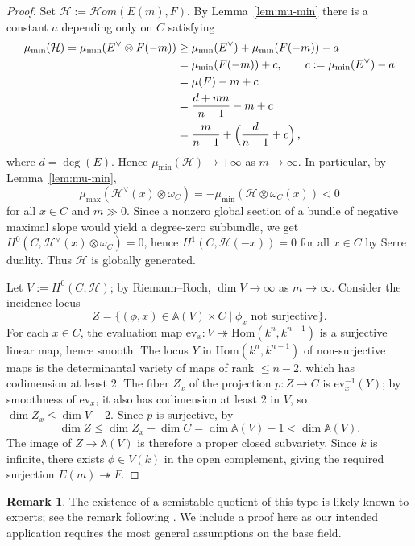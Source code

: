\documentclass[12pt,reqno]{amsart}
\newcommand{\mc}[1]{\mathcal{#1}}
\theoremstyle{definition}
\newtheorem{remark}[theorem]{Remark}
\numberwithin{equation}{section}
\begin{document}
	\begin{proof}
		Set $\mathcal{H} := \mathcal{H}om(E(m), F)$. By Lemma~\ref{lem:mu-min}
		there is a constant $a$ depending only on $C$ satisfying
		\begin{align*}
			\mu_{\mathrm{min}}(\mc{H})
			= \mu_{\min}(E^{\vee} \otimes F(-m))
			&\geq \mu_{\min}(E^{\vee}) + \mu_{\min}(F(-m)) - a \\
			&= \mu_{\mathrm{min}}(F(-m)) + c,
			\qquad c:=\mu_{\min}(E^{\vee})-a \\
			&= \mu(F) - m + c \\
			&= \frac{d+mn}{n-1} - m + c \\
			&= \frac{m}{n-1} + \Bigl(\frac{d}{n-1}+c\Bigr)\,,
		\end{align*}
		where $d = \deg(E)$. Hence $\mu_{\min}(\mathcal{H}) \to +\infty$ as
		$m \to \infty$. In particular, by Lemma~\ref{lem:mu-min},
		\[
		\mu_{\max}(\mathcal{H}^\vee(x) \otimes \omega_C)
		= -\mu_{\min}(\mc{H}\otimes \omega_C(x)) < 0
		\]
		for all $x \in C$ and $m\gg 0$. Since a nonzero global section of a bundle
		of negative maximal slope would yield a degree-zero subbundle, we get
		$H^0(C, \mathcal{H}^\vee(x) \otimes \omega_C) = 0$, hence
		$H^1(C, \mathcal{H}(-x)) = 0$ for all $x\in C$ by Serre duality. Thus
		$\mathcal{H}$ is globally generated.
		
		Let $V := H^0(C, \mathcal{H})$; by Riemann--Roch, $\dim V \to \infty$ as
		$m\to \infty$. Consider the incidence locus
		\[
		Z = \{(\phi, x) \in \mathbb{A}(V) \times C \mid \phi_x
		\text{ not surjective}\}.
		\]
		For each $x \in C$, the evaluation map
		$\mathrm{ev}_x : V \twoheadrightarrow \mathrm{Hom}(k^n, k^{n-1})$ is a
		surjective linear map, hence smooth. The locus $Y$ in
		$\mathrm{Hom}(k^n, k^{n-1})$ of non-surjective maps is the determinantal
		variety of maps of rank $\leq n-2$, which has codimension at least $2$. The
		fiber $Z_x$ of the projection $p: Z\longrightarrow C$ is
		$\mathrm{ev}_x^{-1}(Y)$; by smoothness of $\mathrm{ev}_x$, it also has
		codimension at least $2$ in $V$, so $\dim Z_x\leq \dim V - 2$. Since $p$ is
		surjective, by \cite[II~\S~3,~Ex.~3.22]{HartshorneAG}
		\[
		\dim Z \leq \dim Z_x + \dim C = \dim \mathbb{A}(V) - 1 < \dim\mathbb{A}(V).
		\]
		The image of $Z\longrightarrow\mathbb{A}(V)$ is therefore a proper closed
		subvariety. Since $k$ is infinite, there exists $\phi \in V(k)$ in the open
		complement, giving the required surjection $E(m) \twoheadrightarrow F$.
	\end{proof}
	
	\begin{remark}
		The existence of a semistable quotient of this type is likely known to
		experts; see the remark following \cite[Proposition~6.1]{PR03}. We include a
		proof here as our intended application requires the most general assumptions
		on the base field.
	\end{remark}
	
\end{document}
